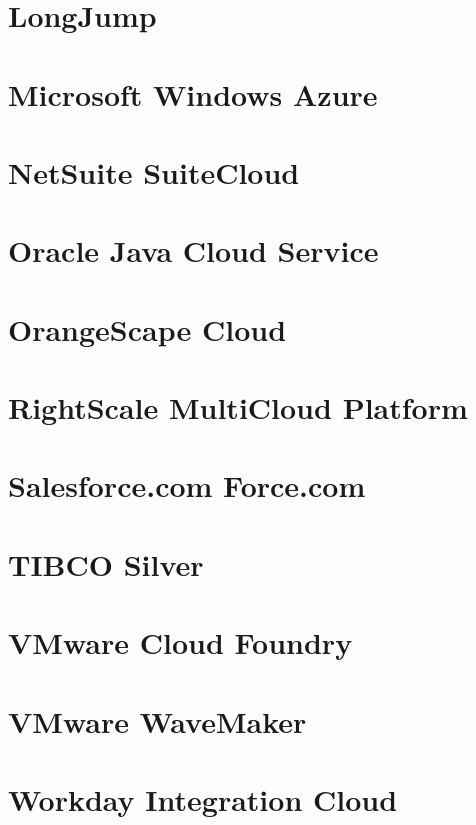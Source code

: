 \section{LongJump}


\newpage
\section{Microsoft Windows Azure}


\newpage
\section{NetSuite SuiteCloud}


\section{Oracle Java Cloud Service}


\section{OrangeScape Cloud}


\newpage
\section{RightScale MultiCloud Platform}


\section{Salesforce.com Force.com}


\section{TIBCO Silver}


\section{VMware Cloud Foundry}


\newpage
\section{VMware WaveMaker}


\newpage
\section{Workday Integration Cloud}

